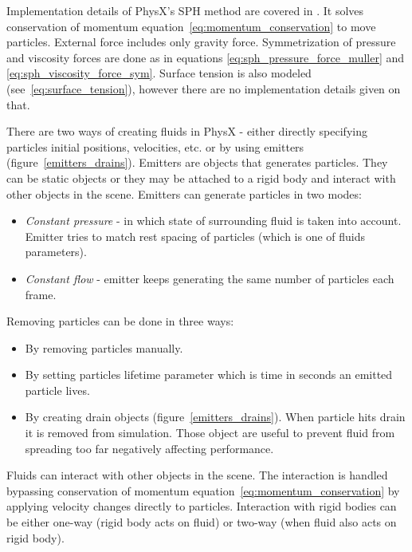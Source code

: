 Implementation details of PhysX's SPH method are covered in \cite{Harris08}. It solves conservation of momentum equation~\ref{eq:momentum_conservation} to move particles. External force includes only gravity force. Symmetrization of pressure and viscosity forces are done as in equations \ref{eq:sph_pressure_force_muller} and \ref{eq:sph_viscosity_force_sym}. Surface tension is also modeled (see~\ref{eq:surface_tension}), however there are no implementation details given on that.

There are two ways of creating fluids in PhysX - either directly specifying particles initial positions, velocities, etc. or by using emitters (figure~\ref{emitters_drains}). Emitters are objects that generates particles. They can be static objects or they may be attached to a rigid body and interact with other objects in the scene. Emitters can generate particles in two modes:
\begin{itemize}\itemsep2pt
\item \textit{Constant pressure} - in which state of surrounding fluid is taken into account. Emitter tries to match rest spacing of particles (which is one of fluids parameters). 
\item \textit{Constant flow} - emitter keeps generating the same number of particles each frame. 
\end{itemize}


Removing particles can be done in three ways:
\begin{itemize}\itemsep2pt
\item By removing particles manually.
\item By setting particles lifetime parameter which is time in seconds an emitted particle lives.
\item By creating drain objects (figure~\ref{emitters_drains}). When particle hits drain it is removed from simulation. Those object are useful to prevent fluid from spreading too far negatively affecting performance.
\end{itemize}

Fluids can interact with other objects in the scene. The interaction is handled bypassing conservation of momentum equation~\ref{eq:momentum_conservation} by applying velocity changes directly to particles. Interaction with rigid bodies can be either one-way (rigid body acts on fluid) or two-way (when fluid also acts on rigid body).

